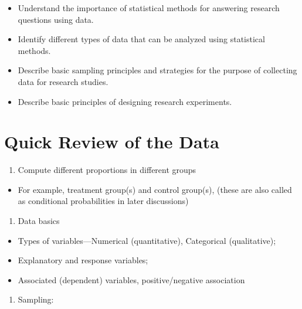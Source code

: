\documentclass[
]{book}
\providecommand{\tightlist}{%
  \setlength{\itemsep}{0pt}\setlength{\parskip}{0pt}}
\begin{document}
\begin{itemize}
\tightlist
\item
  Understand the importance of statistical methods for answering research questions using data.
\item
  Identify different types of data that can be analyzed using statistical methods.
\item
  Describe basic sampling principles and strategies for the purpose of collecting data for research studies.
\item
  Describe basic principles of designing research experiments.
\end{itemize}

\section{Quick Review of the Data}\label{quick-review-of-the-data}

\begin{enumerate}
\def\labelenumi{\arabic{enumi}.}
\tightlist
\item
  Compute different proportions in different groups
\end{enumerate}

\begin{itemize}
\tightlist
\item
  For example, treatment group(s) and control group(s), (these are also called as conditional probabilities in later discussions)
\end{itemize}

\begin{enumerate}
\def\labelenumi{\arabic{enumi}.}
\setcounter{enumi}{1}
\tightlist
\item
  Data basics
\end{enumerate}

\begin{itemize}
\tightlist
\item
  Types of variables---Numerical (quantitative), Categorical (qualitative);
\item
  Explanatory and response variables;
\item
  Associated (dependent) variables, positive/negative association
\end{itemize}

\begin{enumerate}
\def\labelenumi{\arabic{enumi}.}
\setcounter{enumi}{2}
\tightlist
\item
  Sampling:
\end{enumerate}
\end{document}
